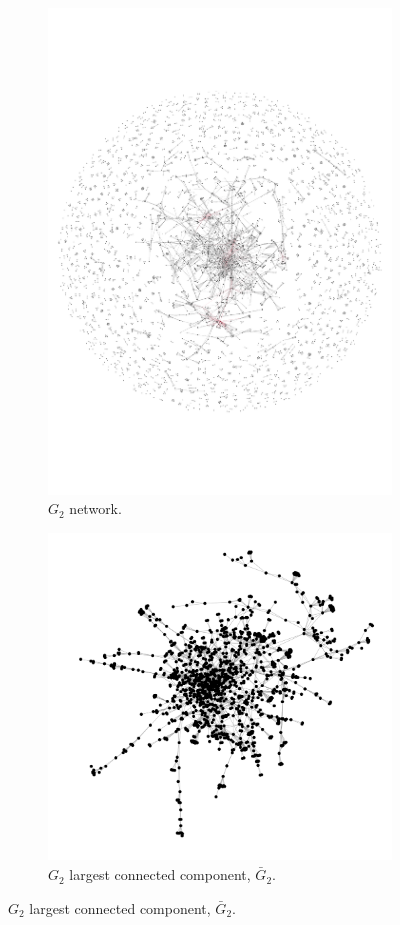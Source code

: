 \documentclass{article}
\theoremstyle{definition}
\begin{document}
\begin{figure}[!hbtp]
     \begin{subfigure}{.45\textwidth}\centering
        \includegraphics[width=.54\textwidth]{./assets/images/auction.pdf}
        \caption{\(G_2\) network.}\label{fig:g_two}
     \end{subfigure}
    \begin{subfigure}{.45\textwidth}\centering
        \includegraphics[width=.54\textwidth]{./assets/images/auction_network_cluster.pdf}
        \caption{\(G_2\) largest connected component,  \(\bar{G}_{2}\).}\label{fig:g_two_cluster}
    \end{subfigure}


\end{figure}
\end{document}
